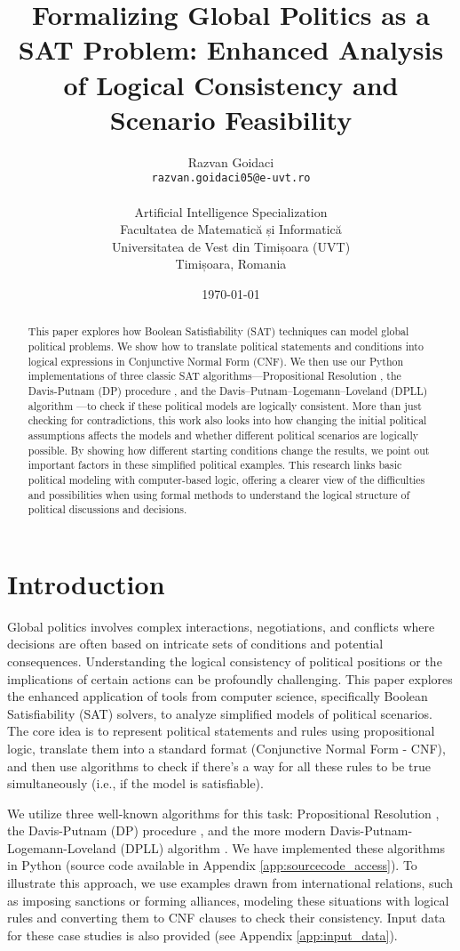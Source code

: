 \documentclass[11pt, a4paper]{article}
\title{Formalizing Global Politics as a SAT Problem: Enhanced Analysis of Logical Consistency and Scenario Feasibility}
\author{
    Razvan Goidaci \\
    \texttt{razvan.goidaci05@e-uvt.ro} \\ \\
    Artificial Intelligence Specialization \\
    Facultatea de Matematică și Informatică \\
    Universitatea de Vest din Timișoara (UVT) \\
    Timișoara, Romania
}
\date{\today}
\begin{document}
\maketitle

\begin{abstract}
This paper explores how Boolean Satisfiability (SAT) techniques can model global political problems. We show how to translate political statements and conditions into logical expressions in Conjunctive Normal Form (CNF). We then use our Python implementations of three classic SAT algorithms—Propositional Resolution \cite{Robinson1965}, the Davis-Putnam (DP) procedure \cite{DavisPutnam1960}, and the Davis–Putnam–Logemann–Loveland (DPLL) algorithm \cite{DPLL1962}—to check if these political models are logically consistent. More than just checking for contradictions, this work also looks into how changing the initial political assumptions affects the models and whether different political scenarios are logically possible. By showing how different starting conditions change the results, we point out important factors in these simplified political examples. This research links basic political modeling with computer-based logic, offering a clearer view of the difficulties and possibilities when using formal methods to understand the logical structure of political discussions and decisions.
\end{abstract}

\section{Introduction}

Global politics involves complex interactions, negotiations, and conflicts where decisions are often based on intricate sets of conditions and potential consequences. Understanding the logical consistency of political positions or the implications of certain actions can be profoundly challenging. This paper explores the enhanced application of tools from computer science, specifically Boolean Satisfiability (SAT) solvers, to analyze simplified models of political scenarios. The core idea is to represent political statements and rules using propositional logic, translate them into a standard format (Conjunctive Normal Form - CNF), and then use algorithms to check if there's a way for all these rules to be true simultaneously (i.e., if the model is satisfiable).

We utilize three well-known algorithms for this task: Propositional Resolution \cite{Robinson1965}, the Davis-Putnam (DP) procedure \cite{DavisPutnam1960}, and the more modern Davis-Putnam-Logemann-Loveland (DPLL) algorithm \cite{DPLL1962}. We have implemented these algorithms in Python (source code available in Appendix \ref{app:sourcecode_access}). To illustrate this approach, we use examples drawn from international relations, such as imposing sanctions or forming alliances, modeling these situations with logical rules and converting them to CNF clauses to check their consistency. Input data for these case studies is also provided (see Appendix \ref{app:input_data}).
\end{document}

